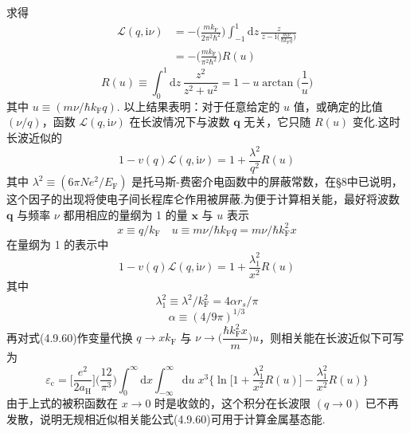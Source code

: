 求得
\begin{equation}
\begin{aligned}
  \mathcal{L}(q,\mathrm{i}\nu)
  &=-\bigg(\frac{mk_{\mathrm{F}}}{2\pi^{2}\hbar^{2}}\bigg)
  \int_{-1}^{1}\mathrm{d}z\,
  \frac{z}{z-\mathrm{i}\big(\frac{m\nu}{\hbar k_{\mathrm{F}}q}\big)}\\
  &=-\bigg(\frac{mk_{\mathrm{F}}}{\pi^{2}\hbar^{2}}\bigg)R(u)
\end{aligned}
\end{equation}
\begin{equation}
  R(u)\equiv\int_{0}^{1}\mathrm{d}z\,\frac{z^{2}}{z^{2}+u^{2}}
  =1-u\arctan\bigg(\frac{1}{u}\bigg)
\end{equation}
其中 $u\equiv\left(m\nu/\hbar k_{\mathrm{F}}q\right)$. 以上结果表明：对于任意给定的 $u$ 值，或确定的比值 $\left(\nu/q\right)$，函数 $\mathcal{L}(q,\mathrm{i}\nu)$ 在长波情况下与波数 $\boldsymbol{q}$ 无关，它只随 $R(u)$ 变化.这时长波近似的
\begin{equation}
  1-v(q)\mathcal{L}(q,\mathrm{i}\nu)
  =1+\frac{\lambda^{2}}{q^{2}}R(u)
\end{equation}
其中 $\lambda^{2}\equiv\left(6\pi Ne^{2}/E_{\mathrm{F}}\right)$ 是托马斯-费密介电函数中的屏蔽常数，在§8中已说明，这个因子的出现将使电子间长程库仑作用被屏蔽.为便于计算相关能，最好将波数 $\boldsymbol{q}$ 与频率 $\nu$ 都用相应的量纲为 1 的量 $\boldsymbol{x}$ 与 $u$ 表示
\begin{equation}
  x\equiv q/k_{\mathrm{F}}\quad u\equiv m\nu/\hbar k_{\mathrm{F}}q
  =m\nu/\hbar k_{\mathrm{F}}^{2}x
\end{equation}
在量纲为 1 的表示中
\begin{equation}
  1-v(q)\mathcal{L}(q,\mathrm{i}\nu)
  =1+\frac{\lambda_{1}^{2}}{x^{2}}R(u)
\end{equation}
其中
\begin{equation}
  \lambda_{1}^{2}\equiv\lambda^{2}/k_{\mathrm{F}}^{2}=4\alpha r_{s}/\pi
\end{equation}
\begin{equation}
  \alpha\equiv\left(4/9\pi\right)^{1/3}
\end{equation}
再对式(4.9.60)作变量代换 $q\to xk_{\mathrm{F}}$ 与 $\nu\to\bigg(\dfrac{\hbar k_{\mathrm{F}}^{2}x}{m}\bigg)u$，则相关能在长波近似下可写为
\begin{equation}
  \varepsilon_{\mathrm{c}}=\bigg[\frac{e^{2}}{2a_{\mathrm{H}}}\bigg]
  \bigg(\frac{12}{\pi^{3}}\bigg)\int_{0}^{\infty}\mathrm{d}x
  \int_{-\infty}^{\infty}\mathrm{d}u\;x^{3}
  \bigg\{\ln\bigg[1+\frac{\lambda_{1}^{2}}{x^{2}}R(u)\bigg]
  -\frac{\lambda_{1}^{2}}{x^{2}}R(u)\bigg\}
\end{equation}
由于上式的被积函数在 $x\to 0$ 时是收敛的，这个积分在长波限 $(q\to 0)$ 已不再发散，说明无规相近似相关能公式(4.9.60)可用于计算金属基态能.

